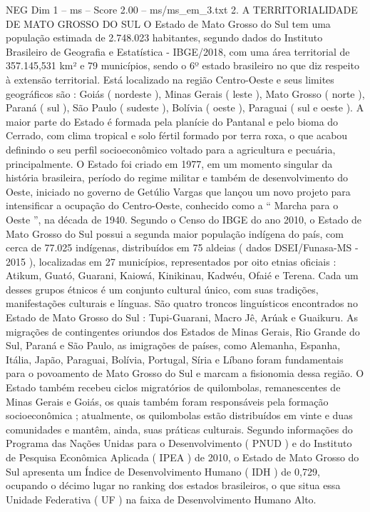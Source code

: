 \begin{textsample}{NEG Dim 1 – ms – Score 2.00 – ms/ms\_em\_3.txt}  \label{ex:f1_neg_102}
2.
A TERRITORIALIDADE DE MATO GROSSO DO SUL O Estado de Mato Grosso do Sul tem uma população estimada de 2.748.023 habitantes, segundo dados do Instituto Brasileiro de Geografia e Estatística - IBGE/2018, com uma área territorial de 357.145,531 km² e 79 municípios, sendo o 6º estado brasileiro no que diz respeito à extensão territorial.
Está localizado na região Centro-Oeste e seus limites geográficos são : Goiás ( nordeste ), Minas Gerais ( leste ), Mato Grosso ( norte ), Paraná ( sul ), São Paulo ( sudeste ), Bolívia ( oeste ), Paraguai ( sul e oeste ).
A maior parte do Estado é formada pela planície do Pantanal e pelo bioma do Cerrado, com clima tropical e solo fértil formado por terra roxa, o que acabou definindo o seu perfil socioeconômico voltado para a agricultura e pecuária, principalmente.
O Estado foi criado em 1977, em um momento singular da história brasileira, período do regime militar e também de desenvolvimento do Oeste, iniciado no governo de Getúlio Vargas que lançou um novo projeto para intensificar a ocupação do Centro-Oeste, conhecido como a “ Marcha para o Oeste ”, na década de 1940.
Segundo o Censo do IBGE do ano 2010, o Estado de Mato Grosso do Sul possui a segunda maior população indígena do país, com cerca de 77.025 indígenas, distribuídos em 75 aldeias ( dados DSEI/Funasa-MS - 2015 ), localizadas em 27 municípios, representados por oito etnias oficiais : Atikum, Guató, Guarani, Kaiowá, Kinikinau, Kadwéu, Ofaié e Terena.
Cada um desses grupos étnicos é um conjunto cultural único, com suas tradições, manifestações culturais e línguas.
São quatro troncos linguísticos encontrados no Estado de Mato Grosso do Sul : Tupi-Guarani, Macro Jê, Arúak e Guaikuru.
As migrações de contingentes oriundos dos Estados de Minas Gerais, Rio Grande do Sul, Paraná e São Paulo, as imigrações de países, como Alemanha, Espanha, Itália, Japão, Paraguai, Bolívia, Portugal, Síria e Líbano foram fundamentais para o povoamento de Mato Grosso do Sul e marcam a fisionomia dessa região.
O Estado também recebeu ciclos migratórios de quilombolas, remanescentes de Minas Gerais e Goiás, os quais também foram responsáveis pela formação socioeconômica ; atualmente, os quilombolas estão distribuídos em vinte e duas comunidades e mantêm, ainda, suas práticas culturais.
Segundo informações do Programa das Nações Unidas para o Desenvolvimento ( PNUD ) e do Instituto de Pesquisa Econômica Aplicada ( IPEA ) de 2010, o Estado de Mato Grosso do Sul apresenta um Índice de Desenvolvimento Humano ( IDH ) de 0,729, ocupando o décimo lugar no ranking dos estados brasileiros, o que situa essa Unidade Federativa ( UF ) na faixa de Desenvolvimento Humano Alto.

\end{textsample}
